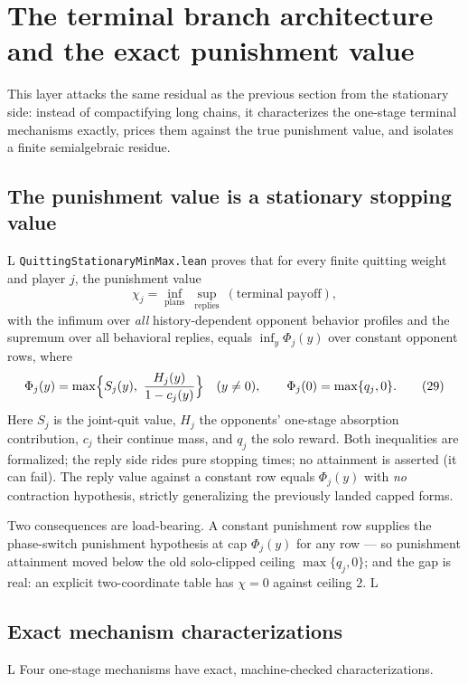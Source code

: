 \documentclass[11pt]{article}
\newcommand{\LTag}{\textsf{L}}
\newcommand{\Prod}{\LTag}
\newcommand{\Status}[1]{#1}
\begin{document}
\section{The terminal branch architecture and the exact punishment value}

This layer attacks the same residual as the previous section from the
stationary side: instead of compactifying long chains, it characterizes the
one-stage terminal mechanisms exactly, prices them against the true
punishment value, and isolates a finite semialgebraic residue.

\subsection{The punishment value is a stationary stopping value}

\Status{\Prod} \texttt{QuittingStationaryMinMax.lean} proves that for every
finite quitting weight and player \(j\), the punishment value
\[
 \chi_j=\inf_{\text{plans}}\ \sup_{\text{replies}}\ (\text{terminal payoff}),
\tag{28}
\]
with the infimum over \emph{all} history-dependent opponent behavior
profiles and the supremum over all behavioral replies, equals
\(\inf_y\Phi_j(y)\) over constant opponent rows, where
\[
 \Phi_j(y)=\max\Bigl\{S_j(y),\ \frac{H_j(y)}{1-c_j(y)}\Bigr\}
 \quad(y\neq0),\qquad
 \Phi_j(0)=\max\{q_j,0\}.
\tag{29}
\]
Here \(S_j\) is the joint-quit value, \(H_j\) the opponents' one-stage
absorption contribution, \(c_j\) their continue mass, and \(q_j\) the solo
reward.  Both inequalities are formalized; the reply side rides pure
stopping times; no attainment is asserted (it can fail).  The reply value
against a constant row equals \(\Phi_j(y)\) with \emph{no} contraction
hypothesis, strictly generalizing the previously landed capped forms.

Two consequences are load-bearing.  A constant punishment row supplies the
phase-switch punishment hypothesis at cap \(\Phi_j(y)\) for any row --- so
punishment attainment moved below the old solo-clipped ceiling
\(\max\{q_j,0\}\); and the gap is real: an explicit two-coordinate table has
\(\chi=0\) against ceiling \(2\).  \Status{\Prod}

\subsection{Exact mechanism characterizations}

\Status{\Prod} Four one-stage mechanisms have exact, machine-checked
characterizations.
\end{document}
